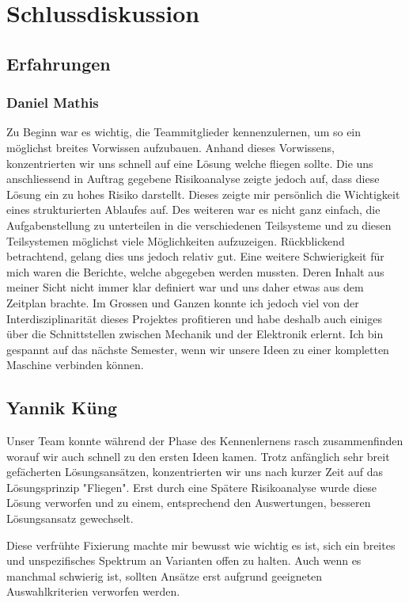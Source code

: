 \section{Schlussdiskussion}

\subsection{Erfahrungen}

\subsubsection*{Daniel Mathis}
Zu Beginn war es wichtig, die Teammitglieder kennenzulernen, um so ein 
möglichst breites Vorwissen aufzubauen. Anhand dieses Vorwissens, 
konzentrierten wir uns schnell auf eine Lösung welche fliegen sollte. Die uns 
anschliessend in Auftrag gegebene Risikoanalyse zeigte jedoch auf, dass diese 
Lösung ein zu hohes Risiko darstellt. Dieses zeigte mir persönlich die 
Wichtigkeit eines strukturierten Ablaufes auf. Des weiteren war es nicht ganz 
einfach, die Aufgabenstellung zu unterteilen in die verschiedenen Teilsysteme 
und zu diesen Teilsystemen möglichst viele Möglichkeiten aufzuzeigen. 
Rückblickend betrachtend, gelang dies uns jedoch relativ gut. Eine weitere 
Schwierigkeit für mich waren die Berichte, welche abgegeben werden mussten. 
Deren Inhalt aus meiner Sicht nicht immer klar definiert war und uns daher 
etwas aus dem Zeitplan brachte. Im Grossen und Ganzen konnte ich jedoch viel 
von der Interdisziplinarität dieses Projektes profitieren und habe deshalb 
auch einiges über die Schnittstellen zwischen Mechanik und der Elektronik 
erlernt. Ich bin gespannt auf das nächste Semester, wenn wir unsere Ideen zu 
einer kompletten Maschine verbinden können.

\subsection{Yannik Küng}
Unser Team konnte während der Phase des Kennenlernens rasch zusammenfinden worauf wir auch schnell zu den ersten Ideen kamen. Trotz anfänglich sehr breit gefächerten Lösungsansätzen, konzentrierten wir uns nach kurzer Zeit auf das Lösungsprinzip "Fliegen". Erst durch eine Spätere Risikoanalyse wurde diese Lösung verworfen und zu einem, entsprechend den Auswertungen, besseren Lösungsansatz gewechselt.

Diese verfrühte Fixierung machte mir bewusst wie wichtig es ist, sich ein breites und unspezifisches Spektrum an Varianten offen zu halten. Auch wenn es manchmal schwierig ist, sollten Ansätze erst aufgrund geeigneten Auswahlkriterien verworfen werden.


